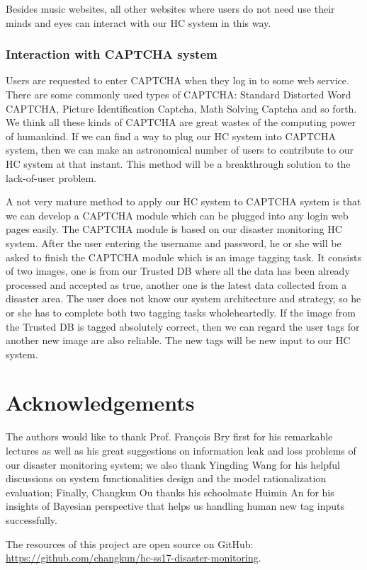 Besides music websites, all other websites where users do not need use their minds and eyes 
can interact with our HC system in this way.

\subsubsection{Interaction with CAPTCHA system}
Users are requested to enter CAPTCHA when they log in to some web service. 
There are some commonly used types of CAPTCHA: Standard Distorted Word CAPTCHA, Picture Identification Captcha, 
Math Solving Captcha and so forth. We think all these kinds of CAPTCHA are great wastes of 
the computing power of humankind. If we can find a way to plug our HC system into CAPTCHA system, 
then we can make an astronomical number of users to contribute to our HC system at that instant. 
This method will be a breakthrough solution to the lack-of-user problem.

A not very mature method to apply our HC system to CAPTCHA system is that we can develop a CAPTCHA module 
which can be plugged into any login web pages easily. The CAPTCHA module is based on our disaster monitoring HC system. 
After the user entering the username and password, he or she will be asked to finish the CAPTCHA module 
which is an image tagging task. It consists of two images, one is from our Trusted DB 
where all the data has been already processed and accepted as true, another one is the latest data 
collected from a disaster area. The user does not know our system architecture and strategy, 
so he or she has to complete both two tagging tasks wholeheartedly. If the image from the Trusted DB is tagged 
absolutely correct, then we can regard the user tags for another new image are also reliable. 
The new tags will be new input to our HC system.

\section*{Acknowledgements}
The authors would like to thank Prof. Fran\c{c}ois Bry first for his remarkable lectures as well as
his great suggestions on information leak and loss problems of our disaster monitoring system;
we also thank Yingding Wang for his helpful discussions on system functionalities design 
and the model rationalization evaluation;
Finally, Changkun Ou thanks his schoolmate Huimin An for his insights of Bayesian perspective that
helps us handling human new tag inputs successfully.

The resources of this project are open source on GitHub: \\
\url{https://github.com/changkun/hc-ss17-disaster-monitoring}.
